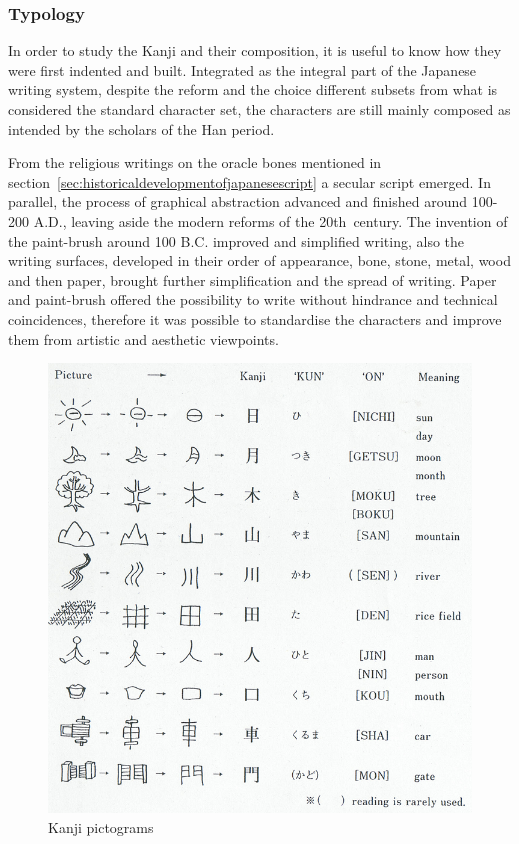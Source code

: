 \subsubsection{Typology}
\label{sec:typologyoftheKanji}

In order to study the Kanji and their composition, it is useful to know how they
were first indented and built. Integrated as the integral part of the Japanese
writing system, despite the reform and the choice different subsets from what is 
considered the standard character set, the characters are still mainly composed
as intended by the scholars of the Han period.

From the religious writings on the oracle bones mentioned in 
section~\ref{sec:historicaldevelopmentofjapanesescript} a secular script 
emerged. In parallel, the process of graphical abstraction advanced and
finished around 100-200 A.D., leaving aside the modern reforms of the 
20th~century. The invention of the paint-brush around 100 B.C. improved and 
simplified writing, also the writing surfaces, developed in their order of 
appearance, bone, stone, metal, wood and then paper, brought further 
simplification and the spread of writing. Paper and paint-brush offered the 
possibility to write without hindrance and technical coincidences, 
therefore it was possible to standardise the characters and improve them from 
artistic and aesthetic viewpoints.

\begin{figure}[htbp]
\begin{center}
\includegraphics[scale=0.4]{images/Kanjipictograms.png}
\caption{Kanji pictograms}
\label{fig:Kanjipictograms}
\end{center}
\end{figure}

